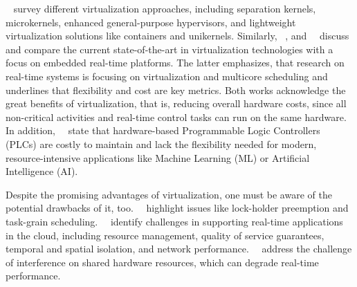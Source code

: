 \documentclass[MMR,Master,english]{twbook}
\begin{document}
\bigskip \noindent \citeauthor{cinqueVirtualizingMixedCriticalitySystems2022}~\cite{cinqueVirtualizingMixedCriticalitySystems2022} survey different virtualization approaches, including separation kernels, microkernels, enhanced general-purpose hypervisors, and lightweight virtualization solutions like containers and unikernels. Similarly, \citeauthor{sandstromVirtualizationTechnologiesEmbedded2013}~\cite{sandstromVirtualizationTechnologiesEmbedded2013}, and~\citeauthor{taccariEmbeddedRealTimeVirtualization2014}~\cite{taccariEmbeddedRealTimeVirtualization2014} discuss and compare the current state-of-the-art in virtualization technologies with a focus on embedded real-time platforms. The latter emphasizes, that research on real-time systems is focusing on virtualization and multicore scheduling and underlines that flexibility and cost are key metrics. Both works acknowledge the great benefits of virtualization, that is, reducing overall hardware costs, since all non-critical activities and real-time control tasks can run on the same hardware. In addition,~\citeauthor{javierperezHowRealTime2022}~\cite{javierperezHowRealTime2022} state that hardware-based Programmable Logic Controllers (PLCs) are costly to maintain and lack the flexibility needed for modern, resource-intensive applications like Machine Learning (ML) or Artificial Intelligence (AI).

\bigskip \noindent Despite the promising advantages of virtualization, one must be aware of the potential drawbacks of it, too.~\citeauthor{guStateoftheArtSurveyRealTime2012}~\cite{guStateoftheArtSurveyRealTime2012} highlight issues like lock-holder preemption and task-grain scheduling.~\citeauthor{garcia-vallsChallengesRealtimeVirtualization2014}~\cite{garcia-vallsChallengesRealtimeVirtualization2014} identify challenges in supporting real-time applications in the cloud, including resource management, quality of service guarantees, temporal and spatial isolation, and network performance.~\citeauthor{scordinoRealTimeVirtualizationIndustrial2020}~\cite{scordinoRealTimeVirtualizationIndustrial2020} address the challenge of interference on shared hardware resources, which can degrade real-time performance.
\end{document}
